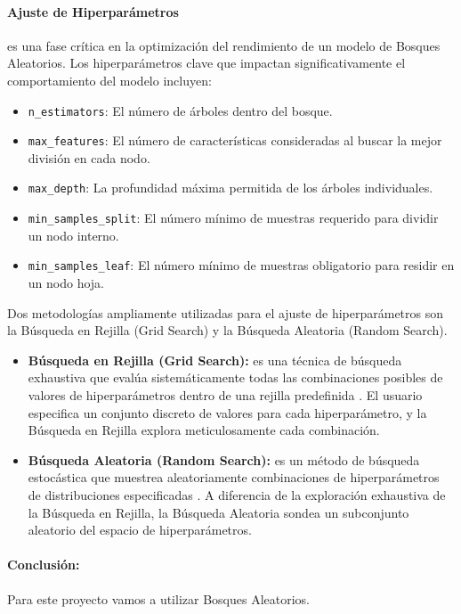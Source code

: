 \paragraph{Ajuste de Hiperparámetros}
es una fase crítica en la optimización del rendimiento de un modelo de Bosques Aleatorios.
Los hiperparámetros clave que impactan significativamente el comportamiento del modelo incluyen:

\begin{itemize}
    \item \texttt{n\_estimators}: El número de árboles dentro del bosque.
    \item \texttt{max\_features}: El número de características consideradas al buscar la mejor división en cada nodo.
    \item \texttt{max\_depth}: La profundidad máxima permitida de los árboles individuales.
    \item \texttt{min\_samples\_split}: El número mínimo de muestras requerido para dividir un nodo interno.
    \item \texttt{min\_samples\_leaf}: El número mínimo de muestras obligatorio para residir en un nodo hoja.
\end{itemize}

Dos metodologías ampliamente utilizadas para el ajuste de hiperparámetros son la Búsqueda en Rejilla (Grid Search) y la Búsqueda Aleatoria (Random Search).

\begin{itemize}
	\item \textbf{Búsqueda en Rejilla (Grid Search):} es una técnica de búsqueda exhaustiva que evalúa sistemáticamente todas las combinaciones posibles de valores de hiperparámetros dentro de una rejilla predefinida \cite{bergstra2012random}.
	El usuario especifica un conjunto discreto de valores para cada hiperparámetro, y la Búsqueda en Rejilla explora meticulosamente cada combinación.

	\item \textbf{Búsqueda Aleatoria (Random Search):} es un método de búsqueda estocástica que muestrea aleatoriamente combinaciones de hiperparámetros de distribuciones especificadas \cite{bergstra2012random}.
	A diferencia de la exploración exhaustiva de la Búsqueda en Rejilla, la Búsqueda Aleatoria sondea un subconjunto aleatorio del espacio de hiperparámetros.
\end{itemize}

\paragraph{Conclusión:}
Para este proyecto vamos a utilizar Bosques Aleatorios.
